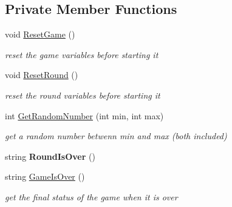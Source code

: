 \subsection*{Private Member Functions}
\begin{DoxyCompactItemize}
\item 
void \hyperlink{class_coinche_1_1_game_rules_a9161e5dc677ba4477f3bdd9ca3c7c8f8}{Reset\+Game} ()
\begin{DoxyCompactList}\small\item\em reset the game variables before starting it \end{DoxyCompactList}\item 
void \hyperlink{class_coinche_1_1_game_rules_a1a4c495c2f6659bfcd9346220c931553}{Reset\+Round} ()
\begin{DoxyCompactList}\small\item\em reset the round variables before starting it \end{DoxyCompactList}\item 
int \hyperlink{class_coinche_1_1_game_rules_a736a9ad94effcbe64f0d23b1d752d26c}{Get\+Random\+Number} (int min, int max)
\begin{DoxyCompactList}\small\item\em get a random number betwenn min and max (both included) \end{DoxyCompactList}\item 
\mbox{\label{class_coinche_1_1_game_rules_a98604d1fad810ad223d8ef359f3abe53}} 
string {\bfseries Round\+Is\+Over} ()
\item 
string \hyperlink{class_coinche_1_1_game_rules_a5cb1f456d58d7cf34640b8a5f8cf0c78}{Game\+Is\+Over} ()
\begin{DoxyCompactList}\small\item\em get the final status of the game when it is over \end{DoxyCompactList}\end{DoxyCompactItemize}
